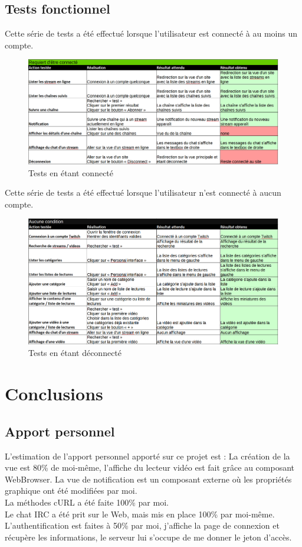 \documentclass[11pt]{report} %
\begin{document}
	\section{Tests fonctionnel}
	Cette série de tests a été effectué lorsque l'utilisateur est connecté à au moins un compte.
	\begin{figure}[h]
		\center
		\includegraphics[width=1\textwidth]{../img/TestsConnect.png}
		\caption{Tests en étant connecté}
		\label{tests connect}
	\end{figure}
	
	Cette série de tests a été effectué lorsque l'utilisateur n'est connecté à aucun compte.
	\begin{figure}[h]
		\center
		\includegraphics[width=1\textwidth]{../img/TestsDisconnect.png}
		\caption{Tests en étant déconnecté}
		\label{tests disconnect}
	\end{figure}
	
\chapter{Conclusions}
\section{Apport personnel}
	L'estimation de l'apport personnel apporté sur ce projet est :
	La création de la vue est 80\% de moi-même, l'affiche du lecteur vidéo est fait grâce au composant WebBrowser. La vue de notification est un composant externe où les propriétés graphique ont été modifiées par moi.\\
	La méthodes cURL a été faite 100\% par moi.\\
	Le chat IRC a été prit sur le Web, mais mis en place 100\% par moi-même.\\
	L'authentification est faites à 50\% par moi, j'affiche la page de connexion et récupère les informations, le serveur lui s'occupe de me donner le jeton d'accès. 
\end{document}
